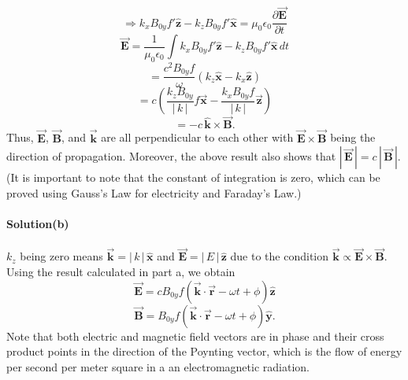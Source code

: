 \documentclass[12pt,a4paper]{article}
\begin{document}
\[\Rightarrow k_xB_{0y}f'\boldsymbol{\hat{z}}-k_zB_{0y}f'\boldsymbol{\hat{x}}=\mu_0\epsilon_0\frac{\partial\boldsymbol{\vec{E}}}{\partial t}\]
\[\boldsymbol{\vec{E}}=\frac{1}{\mu_0\epsilon_0}\int k_xB_{0y}f'\boldsymbol{\hat{z}}-k_zB_{0y}f'\boldsymbol{\hat{x}}\,dt\]
\[=\frac{c^2B_{0y}f}{\omega}\left(k_z\boldsymbol{\hat{x}}-k_x\boldsymbol{\hat{z}}\right)\]
\[=c\left(\frac{k_zB_{0y}}{|\,k\,|}f\boldsymbol{\vec{x}}-\frac{k_xB_{0y}f}{|\,k\,|}\boldsymbol{\vec{z}}\right)\]
\[=-c\,\boldsymbol{\hat{k}}\times\boldsymbol{\vec{B}}.\]
Thus, $\boldsymbol{\vec{E}}$, $\boldsymbol{\vec{B}}$, and $\boldsymbol{\vec{k}}$ are all perpendicular to each other with $\boldsymbol{\vec{E}}\times\boldsymbol{\vec{B}}$ being the direction of propagation. Moreover, the above result also shows that $|\,\boldsymbol{\vec{E}}\,|=c\,|\,\boldsymbol{\vec{B}}\,|$. (It is important to note that the constant of integration is zero, which can be proved using Gauss's Law for electricity and Faraday's Law.)
\\
\\\textbf{Solution(b)}
\\
\\$k_z$ being zero means $\boldsymbol{\vec{k}}=|\,k\,|\,\boldsymbol{\hat{x}}$ and $\boldsymbol{\vec{E}}=|\,E\,|\,\boldsymbol{\hat{z}}$ due to the condition $\boldsymbol{\vec{k}}\propto\boldsymbol{\vec{E}}\times\boldsymbol{\vec{B}}$. Using the result calculated in part a, we obtain
\[\boldsymbol{\vec{E}}=cB_{0y}f(\boldsymbol{\vec{k}}\cdot\boldsymbol{\vec{r}}-\omega t+\phi)\boldsymbol{\hat{z}}\]
\[\boldsymbol{\vec{B}}=B_{0y}f(\boldsymbol{\vec{k}}\cdot\boldsymbol{\vec{r}}-\omega t+\phi)\boldsymbol{\hat{y}}.\]
Note that both electric and magnetic field vectors are in phase and their cross product points in the direction of the Poynting vector, which is the flow of energy per second per meter square in a an electromagnetic radiation.
\end{document}
